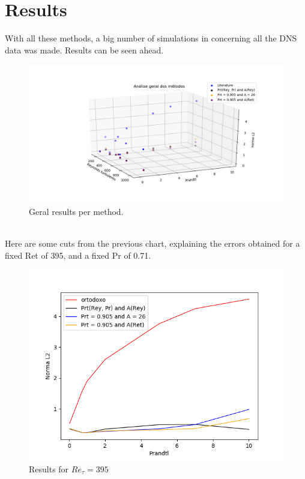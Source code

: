 \documentclass[10pt]{article} %
\begin{document}
\section{Results}
With all these methods, a big number of simulations in concerning all the DNS data was made.
Results can be seen ahead.\\
\begin{figure}[!h]
	\centering
	\includegraphics[angle=0, scale=0.52]{finais}
	\caption{Geral results per method.}
\end{figure}
\\
Here are some cuts from the previous chart, explaining the errors obtained for a fixed Ret of 395, and a fixed Pr of 0.71.
\begin{figure}[!h]
	\centering
	\includegraphics[angle=0, scale=0.59]{finaispr}
	\caption{Results for $Re_\tau = 395$}
\end{figure}
\end{document}
